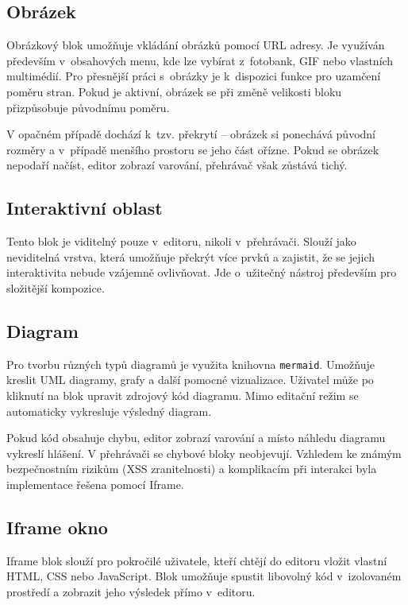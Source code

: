 \subsection{Obrázek}

Obrázkový blok umožňuje vkládání obrázků pomocí URL adresy. 
Je využíván především v~obsahových menu, kde lze vybírat z~fotobank, GIF nebo vlastních multimédií. 
Pro přesnější práci s~obrázky je k~dispozici funkce pro uzamčení poměru stran. 
Pokud je aktivní, obrázek se při změně velikosti bloku přizpůsobuje původnímu poměru. 

V opačném případě dochází k~tzv. překrytí -- obrázek si ponechává původní rozměry a v~případě menšího prostoru se jeho část ořízne.
Pokud se obrázek nepodaří načíst, editor zobrazí varování, přehrávač však zůstává tichý.

\subsection{Interaktivní oblast}

Tento blok je viditelný pouze v~editoru, nikoli v~přehrávači.
Slouží jako neviditelná vrstva, která umožňuje překrýt více prvků a zajistit, že se jejich interaktivita nebude vzájemně ovlivňovat.
Jde o~užitečný nástroj především pro složitější kompozice.

\subsection{Diagram}

Pro tvorbu různých typů diagramů je využita knihovna \texttt{mermaid}. 
Umožňuje kreslit UML diagramy, grafy a další pomocné vizualizace. 
Uživatel může po kliknutí na blok upravit zdrojový kód diagramu. 
Mimo editační režim se automaticky vykresluje výsledný diagram.

Pokud kód obsahuje chybu, editor zobrazí varování a místo náhledu diagramu vykreslí hlášení.
V přehrávači se chybové bloky neobjevují. 
Vzhledem ke známým bezpečnostním rizikům (XSS zranitelnosti) a komplikacím při interakci byla implementace řešena pomocí Iframe.

\subsection{Iframe okno}

Iframe blok slouží pro pokročilé uživatele, kteří chtějí do editoru vložit vlastní HTML, CSS nebo JavaScript. 
Blok umožňuje spustit libovolný kód v~izolovaném prostředí a zobrazit jeho výsledek přímo v~editoru.

